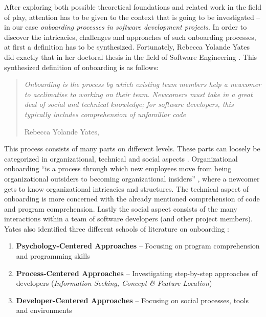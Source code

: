 After exploring both possible theoretical foundations and related work in the field of play, attention has to be given to the context that is going to be investigated -- in our case \textit{onboarding processes in software development projects}. In order to discover the intricacies, challenges and approaches of such onboarding processes, at first a definition has to be synthesized. Fortunately, Rebecca Yolande Yates did exactly that in her doctoral thesis in the field of Software Engineering \cite{yates2014onboarding}. This synthesized definition of onboarding is as follows:

\begin{quote}
  \textit{Onboarding is the process by which existing team members help a newcomer to acclimatise to working on their team. Newcomers must take in a great deal of social and technical knowledge; for software developers, this typically includes comprehension of unfamiliar code}

  \footnotesize{Rebecca Yolande Yates, \cite[p. 33]{yates2014onboarding}}
\end{quote}

This process consists of many parts on different levels. These parts can loosely be categorized in organizational, technical and social aspects \cite[p. 33-35]{yates2014onboarding}. Organizational onboarding \enquote{is a process through which new employees move from being organizational outsiders to becoming organizational insiders} \cite{bauer2011organizational}, where a newcomer gets to know organizational intricacies and structures. The technical aspect of onboarding is more concerned with the already mentioned comprehension of code and program comprehension. Lastly the social aspect consists of the many interactions within a team of software developers (and other project members). Yates also identified three different schools of literature on onboarding \cite[p. 39-40]{yates2014onboarding}:

\begin{enumerate}
  \item{\textbf{Psychology-Centered Approaches} -- Focusing on program comprehension and programming skills}
  \item{\textbf{Process-Centered Approaches} -- Investigating step-by-step approaches of developers (\textit{Information Seeking, Concept \& Feature Location})}
  \item{\textbf{Developer-Centered Approaches} -- Focusing on social processes, tools and environments}
\end{enumerate}


